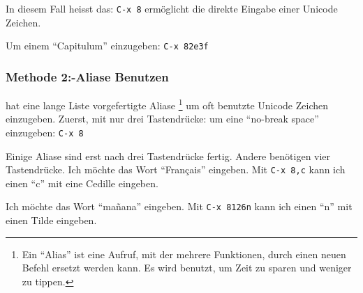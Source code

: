 In diesem Fall heisst das: %
\texttt{C-x 8}
ermöglicht die direkte Eingabe einer Unicode Zeichen.


Um einem \enquote{Capitulum} einzugeben: %
\texttt{C-x 8}\texttt{2e3f}


%
\subsubsection*{Methode 2:\enspace {}-Aliase Benutzen}
 hat eine lange Liste vorgefertigte Aliase%
\footnote{Ein \enquote{Alias} ist eine Aufruf, mit der
mehrere Funktionen, durch einen neuen Befehl ersetzt werden kann.
Es wird benutzt, um Zeit zu sparen und weniger zu tippen.}%
um oft benutzte Unicode Zeichen einzugeben. Zuerst, mit nur
drei Tastendrücke: um eine \enquote{no-break space} einzugeben: %
\texttt{C-x 8}


Einige Aliase sind erst nach drei Tastendrücke fertig. Andere
benötigen vier Tastendrücke. Ich möchte das Wort \enquote{Français}
eingeben. Mit %
\texttt{C-x 8}\texttt{,c}
kann ich einen \enquote{c} mit eine Cedille eingeben.

Ich möchte das Wort \enquote{mañana} eingeben. Mit %
\texttt{C-x 8}\texttt{\char126n}
kann ich einen \enquote{n} mit einen Tilde eingeben.


